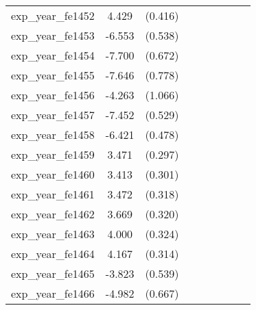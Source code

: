 {\begin{tabular}{l*{4}{cc}}
exp\_year\_fe1452&    4.429\sym{***}&  (0.416)&                  &         &                  &         &                  &         \\
exp\_year\_fe1453&   -6.553\sym{***}&  (0.538)&                  &         &                  &         &                  &         \\
exp\_year\_fe1454&   -7.700\sym{***}&  (0.672)&                  &         &                  &         &                  &         \\
exp\_year\_fe1455&   -7.646\sym{***}&  (0.778)&                  &         &                  &         &                  &         \\
exp\_year\_fe1456&   -4.263\sym{***}&  (1.066)&                  &         &                  &         &                  &         \\
exp\_year\_fe1457&   -7.452\sym{***}&  (0.529)&                  &         &                  &         &                  &         \\
exp\_year\_fe1458&   -6.421\sym{***}&  (0.478)&                  &         &                  &         &                  &         \\
exp\_year\_fe1459&    3.471\sym{***}&  (0.297)&                  &         &                  &         &                  &         \\
exp\_year\_fe1460&    3.413\sym{***}&  (0.301)&                  &         &                  &         &                  &         \\
exp\_year\_fe1461&    3.472\sym{***}&  (0.318)&                  &         &                  &         &                  &         \\
exp\_year\_fe1462&    3.669\sym{***}&  (0.320)&                  &         &                  &         &                  &         \\
exp\_year\_fe1463&    4.000\sym{***}&  (0.324)&                  &         &                  &         &                  &         \\
exp\_year\_fe1464&    4.167\sym{***}&  (0.314)&                  &         &                  &         &                  &         \\
exp\_year\_fe1465&   -3.823\sym{***}&  (0.539)&                  &         &                  &         &                  &         \\
exp\_year\_fe1466&   -4.982\sym{***}&  (0.667)&                  &         &                  &         &                  &         \\

\end{tabular}}
